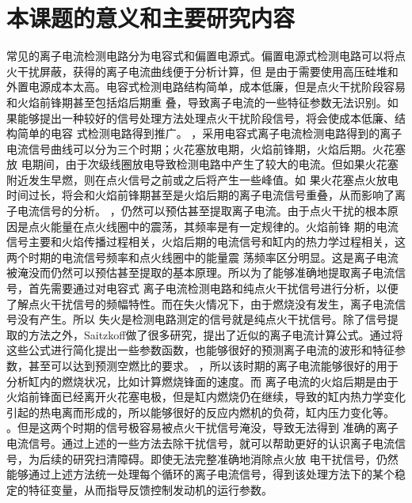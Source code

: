 \section{本课题的意义和主要研究内容}
常见的离子电流检测电路分为电容式和偏置电源式。偏置电源式检测电路可以将点火干扰屏蔽，获得的离子电流曲线便于分析计算\cite{cyb2012}，但
是由于需要使用高压硅堆和外置电源成本太高。电容式检测电路结构简单，成本低廉，但是点火干扰阶段容易和火焰前锋期甚至包括焰后期重
叠，导致离子电流的一些特征参数无法识别。如果能够提出一种较好的信号处理方法处理点火干扰阶段信号，将会使成本低廉、结构简单的电容
式检测电路得到推广。
，采用电容式离子电流检测电路得到的离子电流信号曲线可以分为三个时期；火花塞放电期，火焰前锋期，火焰后期。火花塞放
电期间，由于次级线圈放电导致检测电路中产生了较大的电流。但如果火花塞附近发生早燃，则在点火信号之前或之后将产生一些峰值\cite{eriksson1997closed}。如
果火花塞点火放电时间过长，将会和火焰前锋期甚至是火焰后期的离子电流信号重叠，从而影响了离子电流信号的分析。
，仍然可以预估甚至提取离子电流。由于点火干扰的根本原因是点火能量在点火线圈中的震荡，其频率是有一定规律的。火焰前锋
期的电流信号主要和火焰传播过程相关，火焰后期的电流信号和缸内的热力学过程相关，这两个时期的电流信号频率和点火线圈中的能量震
荡频率区分明显。这是离子电流被淹没而仍然可以预估甚至提取的基本原理。所以为了能够准确地提取离子电流信号，首先需要通过对电容式
离子电流检测电路和纯点火干扰信号进行分析，以便了解点火干扰信号的频幅特性。而在失火情况下，由于燃烧没有发生，离子电流信号没有产生。所以
失火是检测电路测定的信号就是纯点火干扰信号。除了信号提取的方法之外，Saitzkoff\cite{saitzkoff1996ionization}做了很多研究，提出了近似的离子电流计算公式。通过将
这些公式进行简化提出一些参数函数，也能够很好的预测离子电流的波形和特征参数，甚至可以达到预测空燃比的要求。
，所以该时期的离子电流能够很好的用于分析缸内的燃烧状况，比如计算燃烧锋面的速度。而
离子电流的火焰后期是由于火焰前锋面已经离开火花塞电极，但是缸内燃烧仍在继续，导致的缸内热力学变化引起的热电离而形成的，所以能够很好的反应内燃机的负荷，缸内压力变化等。
。但是这两个时期的信号极容易被点火干扰信号淹没，导致无法得到
准确的离子电流信号。通过上述的一些方法去除干扰信号，就可以帮助更好的认识离子电流信号，为后续的研究扫清障碍。即使无法完整准确地消除点火放
电干扰信号，仍然能够通过上述方法统一处理每个循环的离子电流信号，得到该处理方法下的某个稳定的特征变量，从而指导反馈控制发动机的运行参数。
